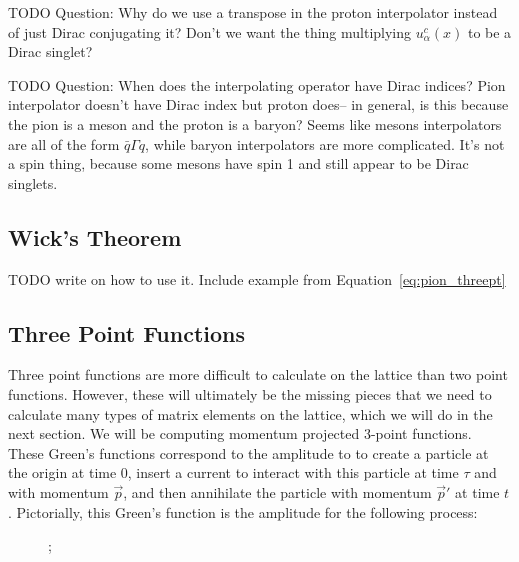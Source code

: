 \documentclass[11pt, oneside]{article}   	%
\theoremstyle{definition}
\begin{document}
TODO Question: Why do we use a transpose in the proton interpolator instead of just Dirac conjugating it? Don't we want the thing multiplying 
$u_\alpha^c(x)$ to be a Dirac singlet? 

TODO Question: When does the interpolating operator have Dirac indices? Pion interpolator doesn't have Dirac index but proton does-- in general, is 
this because the pion is a meson and the proton is a baryon? Seems like mesons interpolators are all of the form $\bar q \Gamma q$, while 
baryon interpolators are more complicated. It's not a spin thing, because some mesons have spin 1 and still appear to be Dirac singlets. 

\subsection{Wick's Theorem}

TODO write on how to use it. Include example from Equation~\ref{eq:pion_threept}

\subsection{Three Point Functions}

Three point functions are more difficult to calculate on the lattice than two point functions. However, these will ultimately be the missing 
pieces that we need to calculate many types of matrix elements on the lattice, which we will do in the next section. We will be computing 
momentum projected 3-point functions. These Green's functions correspond to the amplitude to to create a particle at the origin at time 0, 
insert a current to interact with this particle at time $\tau$ and with momentum $\vec p$, and then annihilate the particle with momentum 
$\vec p'$ at time $t$. Pictorially, this Green's function is the amplitude for the following process:
\begin{figure}[H]
\centering
{};
\end{figure}
\end{document}
